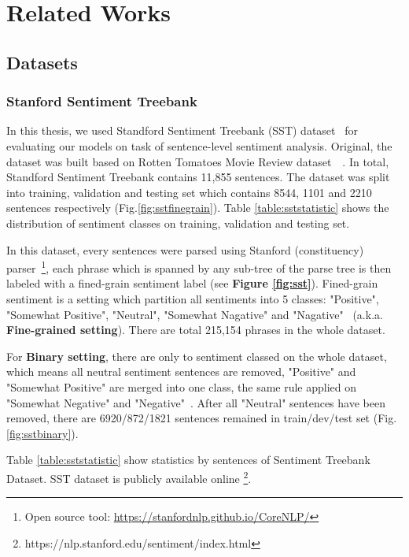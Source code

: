 \hypertarget{chap:related}{\chapter{Related Works}}
\label{chap:related-work}
\section{Datasets}\label{sec:dataset}
\subsection{Stanford Sentiment Treebank} \label{sec:sst}
In this thesis, we used Standford Sentiment Treebank (SST) dataset~\cite{socher2013recursive} for evaluating our models on task of sentence-level sentiment analysis. 
Original, the dataset was built based on Rotten Tomatoes Movie Review dataset~\cite{Rotten-Tomato}~\cite{socher2013recursive}. 
In total, Standford Sentiment Treebank contains 11,855 sentences. 
The dataset was split into training, validation and testing set which contains 8544, 1101 and 2210 sentences respectively (Fig.\ref{fig:sstfinegrain}).
Table \ref{table:sststatistic} shows the distribution of sentiment classes on training, validation and testing set. 

In this dataset, every sentences were parsed using Stanford (constituency) parser~\cite{socher2013recursive}\footnote{Open source tool: \url{https://stanfordnlp.github.io/CoreNLP/}}, each phrase which is spanned by any sub-tree of the parse tree is then labeled with  a fined-grain sentiment label (see \textbf{Figure \ref{fig:sst}}). 
Fined-grain sentiment is a setting which partition all sentiments into 5 classes: "Positive", "Somewhat Positive", "Neutral", "Somewhat Nagative" and "Nagative"~\cite{socher2013recursive} (a.k.a. \textbf{Fine-grained setting}).
There are total 215,154 phrases in the whole dataset. 

For \textbf{Binary setting}, there are only to sentiment classed on the whole dataset, which means all neutral sentiment sentences are removed, "Positive" and "Somewhat Positive" are merged into one class, the same rule applied on "Somewhat Negative" and "Negative"~\cite{socher2013recursive}.   
After all "Neutral" sentences have been removed, there are 6920/872/1821 sentences remained in train/dev/test set (Fig. \ref{fig:sstbinary}).


Table \ref{table:sststatistic} show statistics by sentences of Sentiment Treebank Dataset.
SST dataset is publicly available online \footnote{https://nlp.stanford.edu/sentiment/index.html}. 

